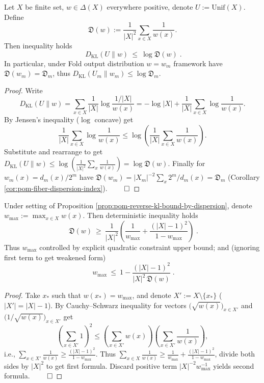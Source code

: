 \begin{proposition}\label{prop:pom-reverse-kl-bound-by-dispersion}
Let \(X\) be finite set, \(w\in\Delta(X)\) everywhere positive, denote \(U:=\mathrm{Unif}(X)\).
Define
\[
\mathfrak{D}(w):=\frac{1}{|X|^2}\sum_{x\in X}\frac{1}{w(x)}.
\]
Then inequality holds
\[
\boxed{\;
D_{\mathrm{KL}}(U\|w)\ \le\ \log \mathfrak{D}(w)\; }.
\]
In particular, under Fold output distribution \(w=w_m\) framework have \(\mathfrak{D}(w_m)=\mathfrak{D}_m\), thus \(D_{\mathrm{KL}}(U_m\|w_m)\le \log \mathfrak{D}_m\).
\end{proposition}
\begin{proof}
Write
\[
D_{\mathrm{KL}}(U\|w)
=\sum_{x\in X}\frac{1}{|X|}\log\frac{1/|X|}{w(x)}
=-\log|X|+\frac{1}{|X|}\sum_{x\in X}\log\frac{1}{w(x)}.
\]
By Jensen's inequality (\(\log\) concave) get
\[
\frac{1}{|X|}\sum_{x\in X}\log\frac{1}{w(x)}
\le
\log\!\left(\frac{1}{|X|}\sum_{x\in X}\frac{1}{w(x)}\right).
\]
Substitute and rearrange to get
\(
D_{\mathrm{KL}}(U\|w)\le \log\!\left(\frac{1}{|X|^2}\sum_x \frac{1}{w(x)}\right)=\log \mathfrak{D}(w)
\).
Finally for \(w_m(x)=d_m(x)/2^m\) have
\(
\mathfrak{D}(w_m)=|X_m|^{-2}\sum_x 2^m/d_m(x)=\mathfrak{D}_m
\)
(Corollary \ref{cor:pom-fiber-dispersion-index}). $\qed$
\end{proof}

\begin{corollary}\label{cor:pom-max-mass-upper-bound-by-dispersion}
Under setting of Proposition \ref{prop:pom-reverse-kl-bound-by-dispersion}, denote \(w_{\max}:=\max_{x\in X}w(x)\).
Then deterministic inequality holds
\[
\boxed{\;
\mathfrak{D}(w)\ \ge\ \frac{1}{|X|^2}\left(\frac{1}{w_{\max}}+\frac{(|X|-1)^2}{1-w_{\max}}\right)\; }.
\]
Thus \(w_{\max}\) controlled by explicit quadratic constraint upper bound; and (ignoring first term to get weakened form)
\[
\boxed{\;
w_{\max}\ \le\ 1-\frac{(|X|-1)^2}{|X|^2\,\mathfrak{D}(w)}\; }.
\]
\end{corollary}
\begin{proof}
Take \(x_\ast\) such that \(w(x_\ast)=w_{\max}\), and denote \(X':=X\setminus\{x_\ast\}\) (\(|X'|=|X|-1\)).
By Cauchy--Schwarz inequality for vectors \(\bigl(\sqrt{w(x)}\bigr)_{x\in X'}\) and \(\bigl(1/\sqrt{w(x)}\bigr)_{x\in X'}\) get
\[
\left(\sum_{x\in X'}1\right)^2
\le
\left(\sum_{x\in X'}w(x)\right)\left(\sum_{x\in X'}\frac{1}{w(x)}\right),
\]
i.e.,
\(
\sum_{x\in X'}\frac{1}{w(x)}\ge \frac{(|X|-1)^2}{1-w_{\max}}
\).
Thus
\(
\sum_{x\in X}\frac{1}{w(x)}\ge \frac{1}{w_{\max}}+\frac{(|X|-1)^2}{1-w_{\max}}
\),
divide both sides by \(|X|^2\) to get first formula.
Discard positive term \(|X|^{-2}w_{\max}^{-1}\) yields second formula. $\qed$
\end{proof}

